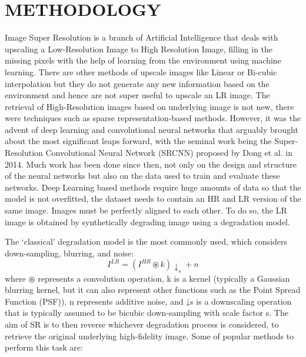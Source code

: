 \newpage
\section{METHODOLOGY}
Image Super Resolution is a branch of Artificial Intelligence that deals with
upscaling a Low-Resolution Image to High Resolution Image, filling in the missing
pixels with the help of learning from the environment using machine learning. There
are other methods of upscale images like Linear or Bi-cubic interpolation but they do
not generate any new information based on the environment and hence are not super
useful to upscale an LR image. The retrieval of High-Resolution images based on
underlying image is not new, there were techniques such as sparse representation-based
methods. However, it was the advent of deep learning and convolutional neural
networks that arguably brought about the most significant leaps forward, with the
seminal work being the Super-Resolution Convolutional Neural Network (SRCNN)
proposed by Dong et al. in 2014. Much work has been done since then, not only on the
design and structure of the neural networks but also on the data used to train and
evaluate these networks. Deep Learning based methods require huge amounts of data
so that the model is not overfitted, the dataset needs to contain an HR and LR version of
the same image. Images must be perfectly aligned to each other. To do so, the LR image
is obtained by synthetically degrading image using a degradation model. 

The ‘classical’ degradation model is the most commonly used, which considers
down-sampling, blurring, and noise: 
$$I^{LR}= (I^{HR} \circledast k)\downarrow_s + n$$
where $\circledast$ represents a convolution operation, k is a kernel (typically a Gaussian blurring
kernel, but it can also represent other functions such as the Point Spread Function
(PSF)), n represents additive noise, and ↓s is a downscaling operation that is typically
assumed to be bicubic down-sampling with scale factor s.
The aim of SR is to then reverse whichever degradation process is considered, to
retrieve the original underlying high-fidelity image. Some of popular methods to
perform this task are: 
